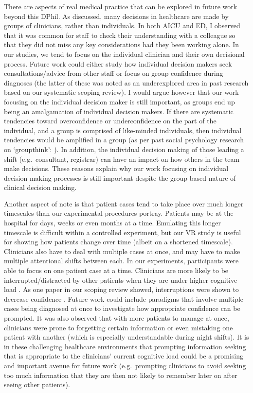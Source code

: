 \documentclass[a4paper, nobind]{templates/ociamthesis}
\begin{document}
\hfill\break
There are aspects of real medical practice that can be explored in future work beyond this DPhil. As discussed, many decisions in healthcare are made by groups of clinicians, rather than individuals. In both AICU and ED, I observed that it was common for staff to check their understanding with a colleague so that they did not miss any key considerations had they been working alone. In our studies, we tend to focus on the individual clinician and their own decisional process. Future work could either study how individual decision makers seek consultations/advice from other staff or focus on group confidence during diagnoses (the latter of these was noted as an underexplored area in past research based on our systematic scoping review). I would argue however that our work focusing on the individual decision maker is still important, as groups end up being an amalgamation of individual decision makers. If there are systematic tendencies toward overconfidence or underconfidence on the part of the individual, and a group is comprised of like-minded individuals, then individual tendencies would be amplified in a group (as per past social psychology research on `groupthink': \autocite{moorhead_empirical_1986,park_review_1990}). In addition, the individual decision making of those leading a shift (e.g.~consultant, registrar) can have an impact on how others in the team make decisions. These reasons explain why our work focusing on individual decision-making processes is still important despite the group-based nature of clinical decision making.

\hfill\break
Another aspect of note is that patient cases tend to take place over much longer timescales than our experimental procedures portray. Patients may be at the hospital for days, weeks or even months at a time. Emulating this longer timescale is difficult within a controlled experiment, but our VR study is useful for showing how patients change over time (albeit on a shortened timescale). Clinicians also have to deal with multiple cases at once, and may have to make multiple attentional shifts between each. In our experiments, participants were able to focus on one patient case at a time. Clinicians are more likely to be interrupted/distracted by other patients when they are under higher cognitive load \autocite{lavie_load_2004}. As one paper in our scoping review showed, interruptions were shown to decrease confidence \autocite{soares_accuracy_2019}. Future work could include paradigms that involve multiple cases being diagnosed at once to investigate how appropriate confidence can be prompted. It was also observed that with more patients to manage at once, clinicians were prone to forgetting certain information or even mistaking one patient with another (which is especially understandable during night shifts). It is in these challenging healthcare environments that prompting information seeking that is appropriate to the clinicians' current cognitive load could be a promising and important avenue for future work (e.g.~prompting clinicians to avoid seeking too much information that they are then not likely to remember later on after seeing other patients).
\end{document}

